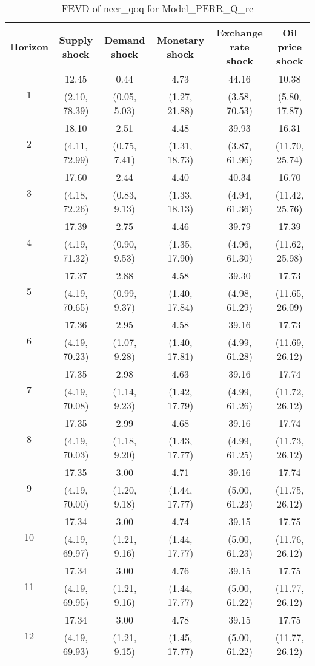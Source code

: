 \documentclass{article}
\begin{document}
\begin{table}
	\footnotesize
	\caption{FEVD of neer_qoq for Model_PERR_Q_rc}
	\begin{tabular}{cccccc}
		Horizon & Supply shock & Demand shock & Monetary shock & Exchange rate shock & Oil price shock\\ \hline
		\multirow{2}{*}{1} & 12.45 & 0.44 & 4.73 & 44.16 & 10.38\\
		 & (2.10, 78.39) & (0.05, 5.03) & (1.27, 21.88) & (3.58, 70.53) & (5.80, 17.87)\\
		\multirow{2}{*}{2} & 18.10 & 2.51 & 4.48 & 39.93 & 16.31\\
		 & (4.11, 72.99) & (0.75, 7.41) & (1.31, 18.73) & (3.87, 61.96) & (11.70, 25.74)\\
		\multirow{2}{*}{3} & 17.60 & 2.44 & 4.40 & 40.34 & 16.70\\
		 & (4.18, 72.26) & (0.83, 9.13) & (1.33, 18.13) & (4.94, 61.36) & (11.42, 25.76)\\
		\multirow{2}{*}{4} & 17.39 & 2.75 & 4.46 & 39.79 & 17.39\\
		 & (4.19, 71.32) & (0.90, 9.53) & (1.35, 17.90) & (4.96, 61.30) & (11.62, 25.98)\\
		\multirow{2}{*}{5} & 17.37 & 2.88 & 4.58 & 39.30 & 17.73\\
		 & (4.19, 70.65) & (0.99, 9.37) & (1.40, 17.84) & (4.98, 61.29) & (11.65, 26.09)\\
		\multirow{2}{*}{6} & 17.36 & 2.95 & 4.58 & 39.16 & 17.73\\
		 & (4.19, 70.23) & (1.07, 9.28) & (1.40, 17.81) & (4.99, 61.28) & (11.69, 26.12)\\
		\multirow{2}{*}{7} & 17.35 & 2.98 & 4.63 & 39.16 & 17.74\\
		 & (4.19, 70.08) & (1.14, 9.23) & (1.42, 17.79) & (4.99, 61.26) & (11.72, 26.12)\\
		\multirow{2}{*}{8} & 17.35 & 2.99 & 4.68 & 39.16 & 17.74\\
		 & (4.19, 70.03) & (1.18, 9.20) & (1.43, 17.77) & (4.99, 61.25) & (11.73, 26.12)\\
		\multirow{2}{*}{9} & 17.35 & 3.00 & 4.71 & 39.16 & 17.74\\
		 & (4.19, 70.00) & (1.20, 9.18) & (1.44, 17.77) & (5.00, 61.23) & (11.75, 26.12)\\
		\multirow{2}{*}{10} & 17.34 & 3.00 & 4.74 & 39.15 & 17.75\\
		 & (4.19, 69.97) & (1.21, 9.16) & (1.44, 17.77) & (5.00, 61.23) & (11.76, 26.12)\\
		\multirow{2}{*}{11} & 17.34 & 3.00 & 4.76 & 39.15 & 17.75\\
		 & (4.19, 69.95) & (1.21, 9.16) & (1.44, 17.77) & (5.00, 61.22) & (11.77, 26.12)\\
		\multirow{2}{*}{12} & 17.34 & 3.00 & 4.78 & 39.15 & 17.75\\
		 & (4.19, 69.93) & (1.21, 9.15) & (1.45, 17.77) & (5.00, 61.22) & (11.77, 26.12)\\
	\end{tabular}
\label{tab:fevd-Model_PERR_Q_rc-neer_qoq}
\end{table}
\end{document}
